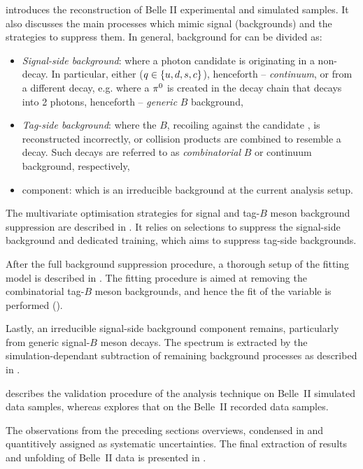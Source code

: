  introduces the reconstruction of Belle II experimental and simulated \BtoXsgamma samples.
It also discusses the main processes which mimic \BtoXsgamma signal (backgrounds) and the strategies to suppress them.
In general, background for \BtoXsgamma can be divided as:
\begin{itemize}
    \item \textit{Signal-side background}: where a photon candidate is originating in a non-\BtoXsgamma decay.
    In particular, either \epem\ra\qqbar ($q\in\{u,d,s,c\}$), henceforth -- \textit{continuum}, or from a different \B decay, e.g. where a $\pi^0$ is created in the decay chain that decays into 2 photons, henceforth -- \textit{generic} $B$ background,
    \item \textit{Tag-side background}: where the $B$, recoiling against the candidate \BtoXsgamma, is reconstructed incorrectly, or \epem\ra\qqbar collision products are combined to resemble a \B decay.
    Such decays are referred to as \textit{combinatorial} $B$ or continuum background, respectively,
    \item \BtoXdgamma component: which is an irreducible background at the current analysis setup. 
\end{itemize}

The
multivariate optimisation strategies for signal and tag-$B$ meson background suppression are described in 
.
It relies on selections to suppress the signal-side background and dedicated \BDT training, which aims to suppress tag-side backgrounds.

After the full background suppression procedure, a thorough setup of the fitting model is described in .
The fitting procedure is aimed at removing the combinatorial tag-$B$ meson backgrounds, and hence the fit of the \Mbc variable is performed ().

Lastly, an irreducible signal-side background component remains, particularly from generic signal-$B$ meson decays.
The \EB spectrum is extracted by the simulation-dependant subtraction of remaining background processes as described in .

 describes the validation procedure of the analysis technique on Belle~II simulated data samples,
whereas  explores that on the Belle~II recorded data samples.

The observations from the preceding sections overviews, condensed in  and quantitively assigned as systematic uncertainties.
The final extraction of results and unfolding of Belle~II data is presented in .
